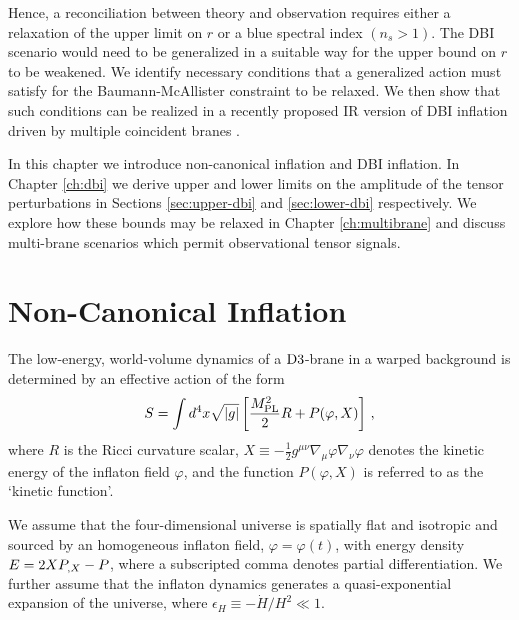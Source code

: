Hence, a reconciliation between theory and observation 
requires either a relaxation of the upper limit on $r$ or a blue 
spectral index $(n_s >1)$. The DBI scenario would need 
to be generalized in a suitable way for the upper bound on $r$
to be weakened. We identify necessary conditions that a 
generalized action must satisfy for the Baumann-McAllister
 constraint to be relaxed. 
We then show that such conditions can be realized in a recently 
proposed IR version of DBI inflation driven
by multiple coincident branes \cite{thomasward}. 


In this chapter we introduce non-canonical inflation and DBI inflation.
In Chapter \ref{ch:dbi} we derive upper and lower 
limits on the amplitude of the tensor perturbations in Sections \ref{sec:upper-dbi} and  
\ref{sec:lower-dbi} respectively.  
We explore how these bounds may be relaxed in Chapter \ref{ch:multibrane} and discuss multi-brane 
scenarios which permit observational tensor signals. 
% 
% 
\section{Non-Canonical Inflation} 
\label{sec:noncanoninfl}


The low-energy, world-volume dynamics of a 
${\rm D3}$-brane in a warped background is determined 
by an effective action of the form 
% 
\begin{equation}
\label{eq:DBIaction-dbiintro2}
S=\int  d^4x \sqrt{|g|} \left[ \frac{M_{\mathrm{PL}}^2}{2} R 
+ P (\varphi , X) \right] \,,
\end{equation}
% 
where $R$ is the Ricci curvature scalar, 
$X \equiv -\frac{1}{2}g^{\mu \nu}\nabla_\mu \varphi \nabla_\nu \varphi$
denotes the kinetic energy of the inflaton field $\varphi$, and the function  
$P (\varphi , X)$ is referred to as the `kinetic function'.  


We assume that the four-dimensional universe is   
spatially flat and isotropic and sourced by an  
homogeneous inflaton field, $\varphi =\varphi (t)$, with energy 
density $E = 2XP_{,X} - P$, where a subscripted comma denotes partial
differentiation. 
We further assume that the inflaton dynamics  
generates a quasi-exponential expansion of the universe, 
where $\epsilon_H \equiv -\dot{H}/H^2 \ll1$. 

